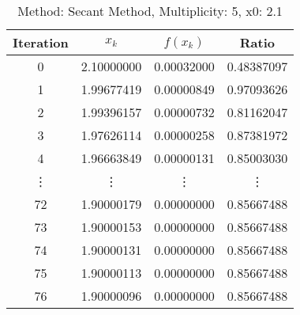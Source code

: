 \begin{table}
\centering
\caption{Method: Secant Method, Multiplicity: 5, x0: 2.1}
\label{tab:table_Secant_Method_5_2_1}
\begin{tabular}{c c c c}
\toprule
Iteration &      $x_k$ &   $f(x_k)$ &      Ratio \\
\midrule
        0 & 2.10000000 & 0.00032000 & 0.48387097 \\
        1 & 1.99677419 & 0.00000849 & 0.97093626 \\
        2 & 1.99396157 & 0.00000732 & 0.81162047 \\
        3 & 1.97626114 & 0.00000258 & 0.87381972 \\
        4 & 1.96663849 & 0.00000131 & 0.85003030 \\
   \vdots &     \vdots &     \vdots &     \vdots \\
       72 & 1.90000179 & 0.00000000 & 0.85667488 \\
       73 & 1.90000153 & 0.00000000 & 0.85667488 \\
       74 & 1.90000131 & 0.00000000 & 0.85667488 \\
       75 & 1.90000113 & 0.00000000 & 0.85667488 \\
       76 & 1.90000096 & 0.00000000 & 0.85667488 \\
\bottomrule
\end{tabular}
\end{table}
